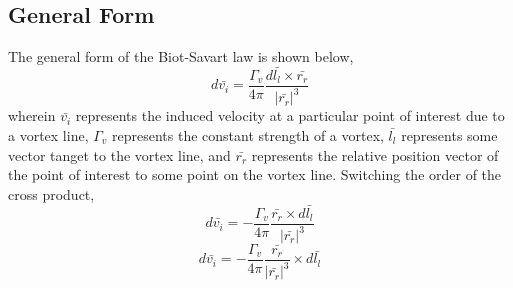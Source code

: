 \documentclass[a4paper, 12pt]{report}
\begin{document}
\begin{center}
\subsection{General Form}
\begin{comment}
\end{comment}
The general form of the Biot-Savart law is shown below,
$$d\bar{v_{i}} = \frac{\Gamma_{v}}{4\pi}\frac{d \bar{l_{l}}\times \bar{r_{r}}}{|\bar{r_{r}}|^{3}}$$
wherein $\bar{v_{i}}$ represents the induced velocity at a particular point of interest due to a vortex line, $\Gamma_{v}$ represents the constant strength of a vortex, $\bar{l_{l}}$ represents some vector tanget to the vortex line, and $\bar{r_{r}}$ represents the relative position vector of the point of interest to some point on the vortex line. Switching the order of the cross product,
$$d\bar{v_{i}} = -\frac{\Gamma_{v}}{4\pi}\frac{\bar{r_{r}}\times d\bar{l_{l}}}{|\bar{r_{r}}|^{3}}$$
\begin{equation}
d\bar{v_{i}} = -\frac{\Gamma_{v}}{4\pi}\frac{\bar{r_{r}}}{|\bar{r_{r}}|^{3}}\times d\bar{l_{l}}
\label{Biot-Savart Law}
\end{equation}




\end{center}
\end{document}
